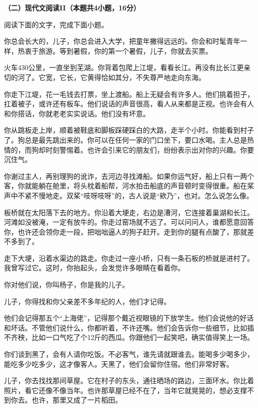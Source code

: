 \documentclass{exam-zh}
\begin{document}
{\bfseries（二）现代文阅读II（本题共4小题，16分）}

阅读下面的文字，完成下面小题。

\begin{material}[title=给儿子,author=陈村,source=1984.8.5\\(有删改）
]
你总会长大的，儿子，你总会进入大学，把童年撇得远远的。你会和时髦青年一样，热衷于旅游。等到暑假，你的第一个暑假，儿子，你就去买票。

火车430公里，一直坐到芜湖。你背着包爬上江堤，看看长江。再没有比长江更亲切的河了。它宽，它长，它黄得恰如其分，不失尊严地走向东海。

你走下江堤，花一毛钱去打票，坐上渡船。船上无疑会有许多人。他们挑着担子，扛着被子，或许还有板车。他们说话的声音很高，看人从来都是正视。也许会有人和你搭话，你就老老实实说话。他们没有坏意。

你从跳板走上岸，顺着被鞋底和脚板踩硬踩白的大路，走半个小时。你能看到村子了。狗总是最先跳出来的。你可以在任何一家的门口坐下，要口水喝。主人总是热情的，而狗却时刻警惕着。也许会引来它的朋友们，纷纷表示出对你的兴趣。你要沉住气。

你谢过主人，再别理狗的讹诈，去河边寻找滩船。如果你运气好，船上只有一两个客，你就能躺在舱里，将头枕着船帮，河水拍击船底的声音顿时变得很重。船在桨声中不紧不慢地走。双桨“吱呀吱呀”的，古人说是“欸乃”，也对。怎么说怎么像。

板桥就在太阳落下去的地方。你沿着大埂走，右边是漕河，它连接着巢湖和长江。河滩如没被淹，一定有放牛的。你走过窑场就不远了。可以问问人，谁都愿意回答你，也许还会领你走一段，把咄咄逼人的狗子赶开。走到你的腿有点酸了，那就差不多到了。

走下大埂，沿着水渠边的路走。你走过一座小桥，只有一条石板的桥就是进村了。我曾写过它。这时，你抬起头，会发觉许多眼睛在看着你。

你对他们说，你叫杨子，你是我的儿子。

儿子，你得找和你父亲差不多年纪的人，他们才记得。

他们会记得那五个“上海佬”，记得那个戴近视眼镜的下放学生。他们会说他的好话和坏话。不管他们说什么，你都听着，不许还嘴。他们会告诉你一些细节，比如插不齐秧，比如一口气吃了个12斤的西瓜。你跟他们一起笑吧，确实值得笑上一场。

你们谈到黑了，会有人请你吃饭。不必客气，谁先请就跟谁去。能喝多少喝多少，能吃多少吃多少，这才像客人。天黑了，他们会留你住宿。他们非常好客。

儿子，你去找找那间草屋。它在村子的东头，通往晒场的路边，三面环水。你比着照片，看它还像不像当年。也许那草屋已经不在了，当年它就晃晃的，想必支撑不到你去。也许，那里又成了一片稻田。


\end{material}
\end{document}
